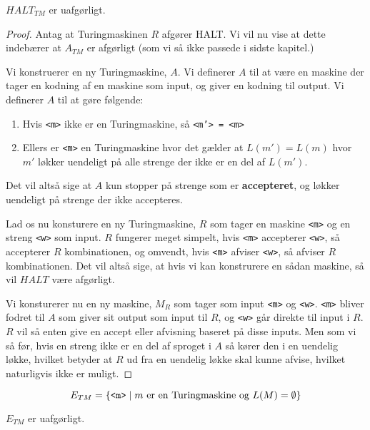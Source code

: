 \begin{theorem}
	$HALT_{TM}$ er uafgørligt.
\end{theorem}

\begin{proof}
	Antag at Turingmaskinen $R$ afgører HALT. Vi vil nu vise at dette indebærer at $A_{TM}$ er afgørligt (som vi så ikke passede i sidste kapitel.)

	Vi konstruerer en ny Turingmaskine, $A$. Vi definerer $A$ til at være en maskine der tager en kodning af en maskine som input, og giver en kodning til output. Vi definerer $A$ til at gøre følgende:
	\begin{enumerate}
		\item Hvis \texttt{<m>} ikke er en Turingmaskine, så \texttt{<m'> = <m>}
		\item Ellers er \texttt{<m>} en Turingmaskine hvor det gælder at $L(m') = L(
			      m)$ hvor $m'$ løkker uendeligt på alle strenge der ikke er en del af $L(m')$.
	\end{enumerate}

	Det vil altså sige at $A$ kun stopper på strenge som er \textbf{accepteret}, og løkker uendeligt på strenge der ikke accepteres.

	Lad os nu konsturere en ny Turingmaskine, $R$ som tager en maskine \texttt{<m>} og en streng \texttt{<w>} som input. $R$ fungerer meget simpelt, hvis \texttt{<m>} accepterer \texttt{<w>}, så accepterer $R$ kombinationen, og omvendt, hvis \texttt{<m>} afviser \texttt{<w>}, så afviser $R$ kombinationen. Det vil altså sige, at hvis vi kan konstrurere en sådan maskine, så vil $HALT$ være afgørligt.

	Vi konsturerer nu en ny maskine, $M_{R}$ som tager som input \texttt{<m>} og \texttt{<w>}. \texttt{<m>} bliver fodret til $A$ som giver sit output som input til $R$, og \texttt{<w>} går direkte til input i $R$. $R$ vil så enten give en accept eller afvisning baseret på disse inputs. Men som vi så før, hvis en streng ikke er en del af sproget i $A$ så kører den i en uendelig løkke, hvilket betyder at $R$ ud fra en uendelig løkke skal kunne afvise, hvilket naturligvis ikke er muligt.

\end{proof}

\begin{equation*}
	E_{TM} = \{\text{\texttt{<m>}} \mid m \text{ er en Turingmaskine og } L(M) = \emptyset\}
\end{equation*}

\begin{theorem}
	\label{teo:etmundecidable}
	$E_{TM}$ er uafgørligt.
\end{theorem}

